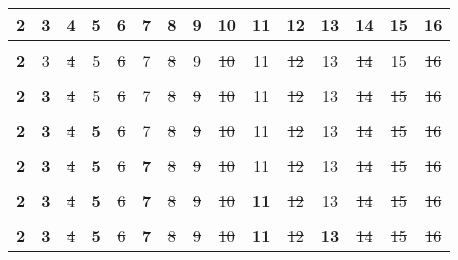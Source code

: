 \documentclass[border=10pt]{standalone}
\newcommand{\cg}{\cellcolor{green}}
\newcommand{\cgg}{\cellcolor{green!20}}
\newcommand{\cb}{\cellcolor{blue}}
\newcommand{\cbb}{\cellcolor{blue!20}}
\newcommand{\clr}{\cellcolor{red}}
\newcommand{\crr}{\cellcolor{red!20}}
\newcommand{\cly}{\cellcolor{yellow}}
\newcommand{\clyy}{\cellcolor{yellow!20}}
\newcommand{\clp}{\cellcolor{purple}}
\newcommand{\clpe}{\cellcolor{cyan}}
\begin{document}
\begin{tabular}{|c|c|c|c|c|c|c|c|c|c|c|c|c|c|c|}
    \hline
    2 & 3 & 4 & 5 & 6 & 7 & 8 & 9 & 10 & 11 & 12 & 13 & 14 & 15 & 16\\
    \hline
    \multicolumn{14}{c}{}\\[0.5ex]
    \hline
    \cg \bf{2} & 3 & \cgg \sout{4} & 5 & \cgg \sout{6} & 7 & \cgg \sout{8} & 9 & \cgg \sout{10} & 11 & \cgg \sout{12} & 13 & \cgg \sout{14} & 15 & \cgg \sout{16} \\
    \hline
    \multicolumn{14}{c}{}\\
    \hline
    \cg \bf{2} & \cb \bf{3} & \cgg \sout{4} & 5 & \cbb \sout{6} & 7 & \cgg \sout{8} & \cbb \sout{9} & \cgg \sout{10} & 11 & \cbb \sout{12} & 13 & \cgg \sout{14} & \cbb \sout{15} & \cgg \sout{16} \\
    \hline
    \multicolumn{14}{c}{}\\
    \hline
    \cg \bf{2} & \cb \bf{3} & \cgg \sout{4} & \clr \bf{5} & \cbb \sout{6} & 7 & \cgg \sout{8} & \cbb \sout{9} & \crr \sout{10} & 11 & \cbb \sout{12} & 13 & \cgg \sout{14} & \crr \sout{15} & \cgg \sout{16} \\
    \hline
    \multicolumn{14}{c}{}\\
    \hline
    \cg \bf{2} & \cb \bf{3} & \cgg \sout{4} & \clr \bf{5} & \cbb \sout{6} & \cly \bf{7} & \cgg \sout{8} & \cbb \sout{9} & \crr \sout{10} & 11 & \cbb \sout{12} & 13 & \clyy \sout{14} & \crr \sout{15} & \cgg \sout{16} \\
    \hline
    \multicolumn{14}{c}{}\\
    \hline
    \cg \bf{2} & \cb \bf{3} & \cgg \sout{4} & \clr \bf{5} & \cbb \sout{6} & \cly \bf{7} & \cgg \sout{8} & \cbb \sout{9} & \crr \sout{10} & \clp \bf{11} & \cbb \sout{12} & 13 & \clyy \sout{14} & \crr \sout{15} & \cgg \sout{16} \\
    \hline
    \multicolumn{14}{c}{}\\
    \hline
    \cg \bf{2} & \cb \bf{3} & \cgg \sout{4} & \clr \bf{5} & \cbb \sout{6} & \cly \bf{7} & \cgg \sout{8} & \cbb \sout{9} & \crr \sout{10} & \clp \bf{11} & \cbb \sout{12} & \clpe \bf{13} & \clyy \sout{14} & \crr \sout{15} & \cgg \sout{16} \\
    \hline
\end{tabular}
\end{document}
